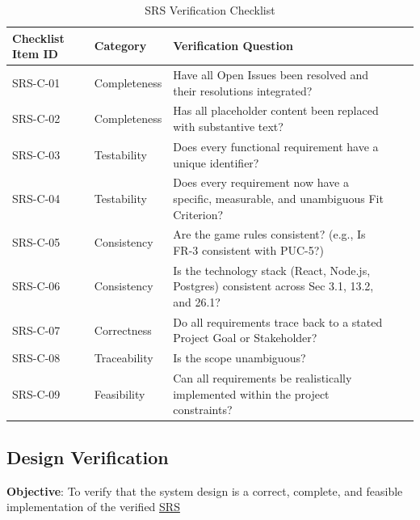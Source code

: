 \documentclass[12pt, titlepage]{article}
\begin{document}
\begin{table}[H]
\centering
\caption{SRS Verification Checklist}
\label{tab:srs-checklist}
\begin{tabular}{|l|l|p{}|l|l|}
\hline
\textbf{Checklist Item ID} & \textbf{Category} & \textbf{Verification Question} \\ \hline
SRS-C-01 & Completeness & Have all Open Issues been resolved and their resolutions integrated?  \\ \hline
SRS-C-02 & Completeness & Has all placeholder content been replaced with substantive text? \\ \hline
SRS-C-03 & Testability & Does every functional requirement have a unique identifier? \\ \hline
SRS-C-04 & Testability & Does every requirement now have a specific, measurable, and unambiguous Fit Criterion? \\ \hline
SRS-C-05 & Consistency & Are the game rules consistent? (e.g., Is FR-3 consistent with PUC-5?)  \\ \hline
SRS-C-06 & Consistency & Is the technology stack (React, Node.js, Postgres) consistent across Sec 3.1, 13.2, and 26.1? \\ \hline
SRS-C-07 & Correctness & Do all requirements trace back to a stated Project Goal or Stakeholder? \\ \hline
SRS-C-08 & Traceability & Is the scope unambiguous? \\ \hline
SRS-C-09 & Feasibility & Can all requirements be realistically implemented within the project constraints? \\ \hline
\end{tabular}
\end{table}


\subsection{Design Verification}
\noindent \textbf{Objective}: To verify that the system design is a correct, complete, and feasible implementation of the verified \href{../SRS/SRS.pdf}{SRS}
\end{document}
